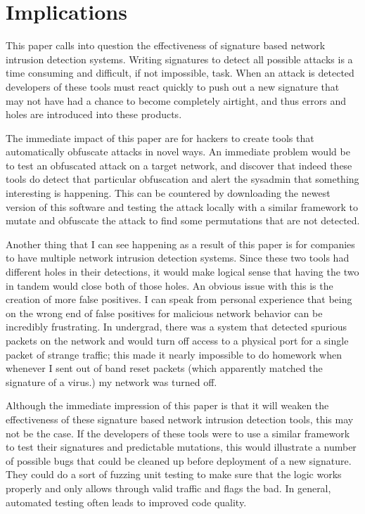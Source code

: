 \documentclass{reading_glasses}
\begin{document}
\section{Implications}
This paper calls into question the effectiveness of signature based network intrusion detection systems.  Writing signatures to detect all possible attacks is a time consuming and difficult, if not impossible, task.  When an attack is detected developers of these tools must react quickly to push out a new signature that may not have had a chance to become completely airtight, and thus errors and holes are introduced into these products.  \cite{vigna2004testing}

The immediate impact of this paper are for hackers to create tools that automatically obfuscate attacks in novel ways.  An immediate problem would be to test an obfuscated attack on a target network, and discover that indeed these tools do detect that particular obfuscation and alert the sysadmin that something interesting is happening.  This can be countered by downloading the newest version of this software and testing the attack locally with a similar framework to mutate and obfuscate the attack to find some permutations that are not detected.  

Another thing that I can see happening as a result of this paper is for companies to have multiple network intrusion detection systems.  Since these two tools had different holes in their detections, it would make logical sense that having the two in tandem would close both of those holes.  An obvious issue with this is the creation of more false positives.  I can speak from personal experience that being on the wrong end of false positives for malicious network behavior can be incredibly frustrating.  In undergrad, there was a system that detected spurious packets on the network and would turn off access to a physical port for a single packet of strange traffic; this made it nearly impossible to do homework when whenever I sent out of band reset packets (which apparently matched the signature of a virus.) my network was turned off.

Although the immediate impression of this paper is that it will weaken the effectiveness of these signature based network intrusion detection tools, this may not be the case.  If the developers of these tools were to use a similar framework to test their signatures and predictable mutations, this would illustrate a number of possible bugs that could be cleaned up before deployment of a new signature.  They could do a sort of fuzzing unit testing to make sure that the logic works properly and only allows through valid traffic and flags the bad.  In general, automated testing often leads to improved code quality.
\end{document}
